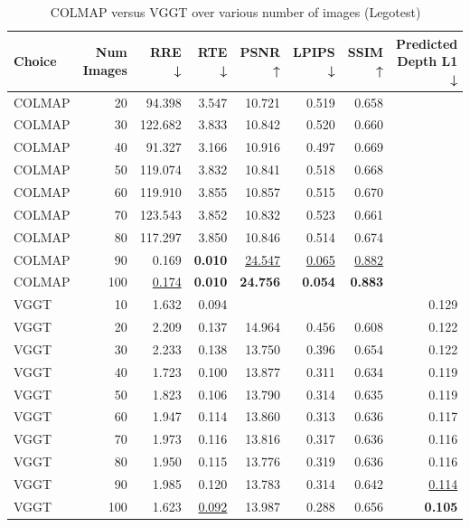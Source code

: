 \begin{table}[H]
\caption{COLMAP versus VGGT over various number of images (Legotest)}
\label{tab:01_num_images_legotest}
\begin{tabular}{lrrrrrrr}
\toprule
Choice & Num Images & RRE ↓ & RTE ↓ & PSNR ↑ & LPIPS ↓ & SSIM ↑ & Predicted Depth L1 ↓ \\
\midrule
COLMAP & 20 & 94.398 & 3.547 & 10.721 & 0.519 & 0.658 &  \\
COLMAP & 30 & 122.682 & 3.833 & 10.842 & 0.520 & 0.660 &  \\
COLMAP & 40 & 91.327 & 3.166 & 10.916 & 0.497 & 0.669 &  \\
COLMAP & 50 & 119.074 & 3.832 & 10.841 & 0.518 & 0.668 &  \\
COLMAP & 60 & 119.910 & 3.855 & 10.857 & 0.515 & 0.670 &  \\
COLMAP & 70 & 123.543 & 3.852 & 10.832 & 0.523 & 0.661 &  \\
COLMAP & 80 & 117.297 & 3.850 & 10.846 & 0.514 & 0.674 &  \\
COLMAP & 90 & 0.169 & \textbf{0.010} & \underline{24.547} & \underline{0.065} & \underline{0.882} &  \\
COLMAP & 100 & \underline{0.174} & \textbf{0.010} & \textbf{24.756} & \textbf{0.054} & \textbf{0.883} &  \\
VGGT & 10 & 1.632 & 0.094 &  &  &  & 0.129 \\
VGGT & 20 & 2.209 & 0.137 & 14.964 & 0.456 & 0.608 & 0.122 \\
VGGT & 30 & 2.233 & 0.138 & 13.750 & 0.396 & 0.654 & 0.122 \\
VGGT & 40 & 1.723 & 0.100 & 13.877 & 0.311 & 0.634 & 0.119 \\
VGGT & 50 & 1.823 & 0.106 & 13.790 & 0.314 & 0.635 & 0.119 \\
VGGT & 60 & 1.947 & 0.114 & 13.860 & 0.313 & 0.636 & 0.117 \\
VGGT & 70 & 1.973 & 0.116 & 13.816 & 0.317 & 0.636 & 0.116 \\
VGGT & 80 & 1.950 & 0.115 & 13.776 & 0.319 & 0.636 & 0.116 \\
VGGT & 90 & 1.985 & 0.120 & 13.783 & 0.314 & 0.642 & \underline{0.114} \\
VGGT & 100 & 1.623 & \underline{0.092} & 13.987 & 0.288 & 0.656 & \textbf{0.105} \\
\bottomrule
\end{tabular}
\end{table}
